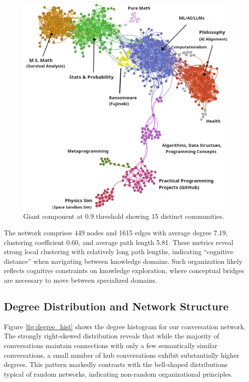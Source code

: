 \documentclass{svproc}
\begin{document}
\begin{figure}[t]
\centering
\includegraphics[width=4.5in]{./images/cluster-vis-topics-better.png}
\caption{Giant component at 0.9 threshold showing 15 distinct communities.}
\label{fig:network_vis}
\end{figure}

The network comprises 449 nodes and 1615 edges with average degree 7.19, clustering coefficient 0.60, and average path length 5.81. These metrics reveal strong local clustering with relatively long path lengths, indicating ``cognitive distance'' when navigating between knowledge domains. Such organization likely reflects cognitive constraints on knowledge exploration, where conceptual bridges are necessary to move between specialized domains.

 

\subsection{Degree Distribution and Network Structure}

Figure \ref{fig:degree_hist} shows the degree histogram for our conversation network. The strongly right-skewed distribution reveals that while the majority of conversations maintain connections with only a few semantically similar conversations, a small number of hub conversations exhibit substantially higher degrees. This pattern markedly contrasts with the bell-shaped distributions typical of random networks, indicating non-random organizational principles.
\end{document}
